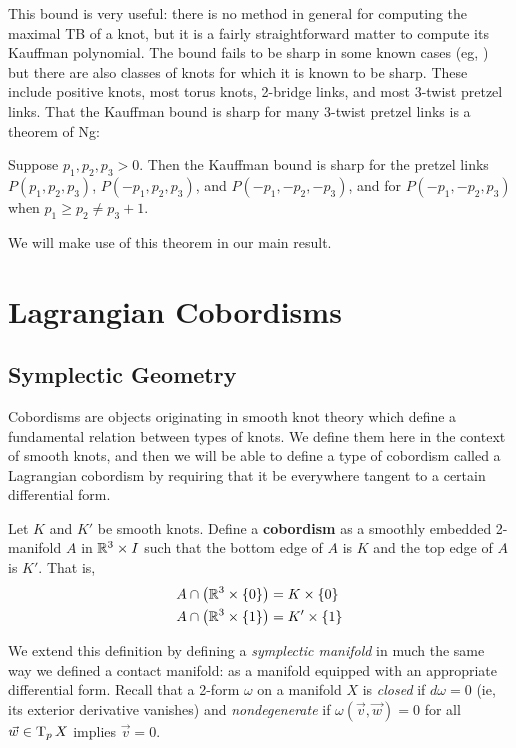 This bound is very useful: there is no method in general for computing the maximal TB of a knot, but it is a fairly straightforward matter to compute its Kauffman polynomial. The bound fails to be sharp in some known cases (eg, \cite{ferrand}) but there are also classes of knots for which it is known to be sharp. These include positive knots, most torus knots, 2-bridge links, and most 3-twist pretzel links. That the Kauffman bound is sharp for many 3-twist pretzel links is a theorem of Ng:

\begin{theorem}[\cite{ng}]
    Suppose $p_1, p_2, p_3 > 0$. Then the Kauffman bound is sharp for the pretzel links $P(p_1, p_2, p_3)$, $P(-p_1, p_2, p_3)$, and $P(-p_1, -p_2, -p_3)$, and for $P(-p_1, -p_2, p_3)$ when $p_1 \geq p_2 \neq p_3 + 1$.
\end{theorem}

We will make use of this theorem in our main result.

\section{Lagrangian Cobordisms}

\subsection{Symplectic Geometry}

Cobordisms are objects originating in smooth knot theory which define a fundamental relation between types of knots. We define them here in the context of smooth knots, and then we will be able to define a type of cobordism called a Lagrangian cobordism by requiring that it be everywhere tangent to a certain differential form.

\begin{definition}
    Let $K$ and $K'$ be smooth knots. Define a \textbf{cobordism} as a smoothly embedded 2-manifold $A$ in $\mathbb{R}^3 \times I$ such that the bottom edge of $A$ is $K$ and the top edge of $A$ is $K'$. That is,
    \begin{align*}
        A \cap \left(\mathbb{R}^3 \times \{0\}\right) &= K \times \{0\}\\
        A \cap \left(\mathbb{R}^3 \times \{1\}\right) &= K' \times \{1\}
    \end{align*}
\end{definition}

We extend this definition by defining a \emph{symplectic manifold} in much the same way we defined a contact manifold: as a manifold equipped with an appropriate differential form. Recall that a 2-form $\omega$ on a manifold $X$ is \emph{closed} if $d \omega = 0$ (ie, its exterior derivative vanishes) and \emph{nondegenerate} if $\omega(\vec v, \vec w) = 0$ for all $\vec w \in \operatorname{T}_p X$ implies $\vec v = 0$.

